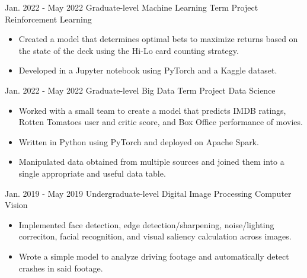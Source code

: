 \documentclass[8pt]{resumeclass}
\begin{document}


\begin{entrylist}
	\entry
		{Jan. 2022 - May 2022}
		{Graduate-level Machine Learning Term Project}
		{Reinforcement Learning}
		{\vspace{-4mm}\begin{itemize}[noitemsep,nolistsep]
			\small
			\item Created a model that determines optimal bets to maximize returns based on the state of the deck using the Hi-Lo card counting strategy.
			\item Developed in a Jupyter notebook using PyTorch and a Kaggle dataset.
		\end{itemize}}
	\entry
		{Jan. 2022 - May 2022}
		{Graduate-level Big Data Term Project}
		{Data Science}
		{\vspace{-4mm}\begin{itemize}[noitemsep,nolistsep]
			\small
			\item Worked with a small team to create a model that predicts IMDB ratings, Rotten Tomatoes user and critic score, and Box Office performance of movies.
			\item Written in Python using PyTorch and deployed on Apache Spark.
			\item Manipulated data obtained from multiple sources and joined them into a single appropriate and useful data table.
		\end{itemize}}
	\entry
		{Jan. 2019 - May 2019}
		{Undergraduate-level Digital Image Processing}
		{Computer Vision}
		{{\vspace{-4mm}\begin{itemize}[noitemsep,nolistsep]
			\small
			\item Implemented face detection, edge detection/sharpening, noise/lighting correciton, facial recognition, and visual saliency calculation across images.
			\item Wrote a simple model to analyze driving footage and automatically detect crashes in said footage.
		\end{itemize}}}
\end{entrylist}

\end{document}
